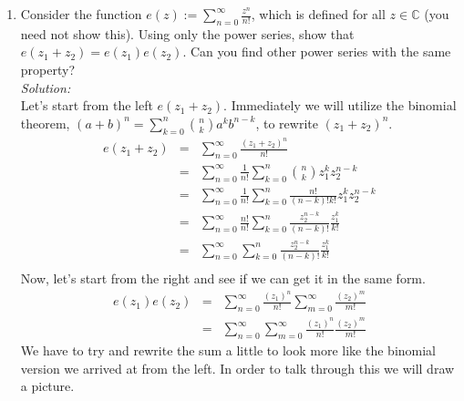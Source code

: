 \documentclass[10pt]{amsart}
\theoremstyle{nonumberplain}
\begin{document}
\begin{enumerate}[label={\bf {\arabic*}:}]
\item Consider the function $e(z):=\sum_{n=0}^{\infty}
  \frac{z^n}{n!}$, which is defined for all $z \in \mathbb{C}$ (you
  need not show this). Using only the power series, show that
  $e\left(z_1+z_2\right)=e\left(z_1\right) e\left(z_2\right)$. Can you
  find other power series with the same property? \\
\textit{Solution:} \\
Let's start from the left $e\left(z_1+z_2\right)$.
Immediately we will utilize the binomial theorem, $(a + b)^n = \sum_{k=0}^{n} {n \choose k}a^k b^{n-k} $, to rewrite $(z_1+z_2)^n$. \\
\begin{eqnarray*}
e\left(z_1+z_2\right) &=& \sum_{n=0}^{\infty} \frac{(z_1+z_2)^n}{n!} \\
			       &=& \sum_{n=0}^{\infty} \frac{1}{n!} \sum_{k=0}^{n} {n \choose k}z_1^k z_2^{n-k} \\
			       &=& \sum_{n=0}^{\infty} \frac{1}{n!} \sum_{k=0}^{n} \frac{n!}{(n-k)! k!}z_1^k z_2^{n-k} \\
			       &=& \sum_{n=0}^{\infty} \frac{n!}{n!} \sum_{k=0}^{n} \frac{z_2^{n-k}}{(n-k)!} \frac{z_1^k}{k!} \\
			       &=& \sum_{n=0}^{\infty} \sum_{k=0}^{n} \frac{z_2^{n-k}}{(n-k)!} \frac{z_1^k}{k!} \\
\end{eqnarray*}
Now, let's start from the right and see if we can get it in the same form.
\begin{eqnarray*}
e\left(z_1\right) e\left(z_2\right) &=& \sum_{n=0}^{\infty} \frac{(z_1)^n}{n!} \sum_{m=0}^{\infty} \frac{(z_2)^m}{m!} \\
			       		        &=& \sum_{n=0}^{\infty} \sum_{m=0}^{\infty} \frac{(z_1)^n}{n!} \frac{(z_2)^m}{m!}
\end{eqnarray*}
We have to try and rewrite the sum a little to look more like the binomial version we arrived at from the left.
In order to talk through this we will draw a picture.
\begin{figure}[h]
   \quad \quad

\end{figure}
\end{enumerate}
\end{document}
